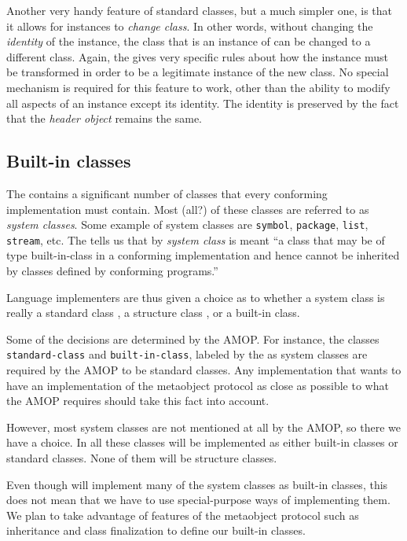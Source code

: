 Another very handy feature of standard classes, but a much simpler
one, is that it allows for instances to \emph{change class}.  In other
words, without changing the \emph{identity} of the instance, the class
that is an instance of can be changed to a different class.  Again,
the \hs{} gives very specific rules about how the instance must be
transformed in order to be a legitimate instance of the new class.  No
special mechanism is required for this feature to work, other than the
ability to modify all aspects of an instance except its identity.  The
identity is preserved by the fact that the \emph{header object}
remains the same. 

\subsection{Built-in classes}
\label{object-system-built-in-classes}

The \hs{} contains a significant number of classes that every
conforming implementation must contain.  Most (all?) of these classes
are referred to as \emph{system classes}.  Some example of system
classes are \texttt{symbol}, \texttt{package}, \texttt{list},
\texttt{stream}, etc.  The \hs{} tells us that by \emph{system
  class} is meant ``a class that may be of type built-in-class in a
conforming implementation and hence cannot be inherited by classes
defined by conforming programs.'' 

Language implementers are thus given a choice as to whether a system
class is really a standard class
, a structure class 
, or a built-in class.  

Some of the decisions are determined by the AMOP.  For instance, the
classes \texttt{standard-class} and \texttt{built-in-class}, labeled
by the \hs{} as system classes are required by the AMOP to be
standard classes.  Any implementation that wants to have an
implementation of the metaobject protocol as close as possible to what
the AMOP requires should take this fact into account. 

However, most system classes are not mentioned at all by the AMOP, so
there we have a choice.  In \sysname{} all these classes will be
implemented as either built-in classes or standard classes.  None of
them will be structure classes. 

Even though \sysname{} will implement many of the system classes as
built-in classes, this does not mean that we have to use
special-purpose ways of implementing them.  We plan to take advantage
of features of the metaobject protocol such as inheritance and class
finalization to define our built-in classes.  

